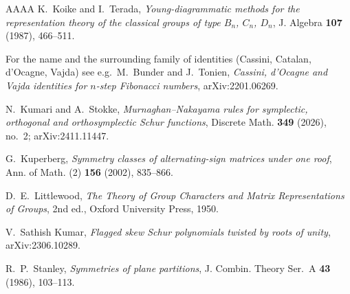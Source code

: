 \documentclass[11pt,reqno]{amsart}
\theoremstyle{plain}
\theoremstyle{definition}
\begin{document}
\begin{thebibliography}{AAAA}
 K.~Koike and I.~Terada, \emph{Young-diagrammatic methods for the representation
theory of the classical groups of type $B_n$, $C_n$, $D_n$}, J. Algebra \textbf{107} (1987),
466--511.

 For the name and the surrounding family of identities (Cassini, Catalan,
d'Ocagne, Vajda) see e.g.\ M.~Bunder and J.~Tonien, \emph{Cassini, d'Ocagne and Vajda identities for
$n$-step Fibonacci numbers}, arXiv:2201.06269.

 N.~Kumari and A.~Stokke, \emph{Murnaghan--Nakayama rules for symplectic,
orthogonal and orthosymplectic Schur functions}, Discrete Math. \textbf{349} (2026), no.~2;
arXiv:2411.11447.

 G.~Kuperberg, \emph{Symmetry classes of alternating-sign matrices under one
roof}, Ann. of Math. (2) \textbf{156} (2002), 835--866.

 D.~E.~Littlewood, \emph{The Theory of Group Characters and Matrix
Representations of Groups}, 2nd ed., Oxford University Press, 1950.

 V.~Sathish Kumar, \emph{Flagged skew Schur polynomials twisted by roots of
unity}, arXiv:2306.10289.

 R.~P.~Stanley, \emph{Symmetries of plane partitions}, J. Combin. Theory
Ser.~A \textbf{43} (1986), 103--113.

\end{thebibliography}
\end{document}
